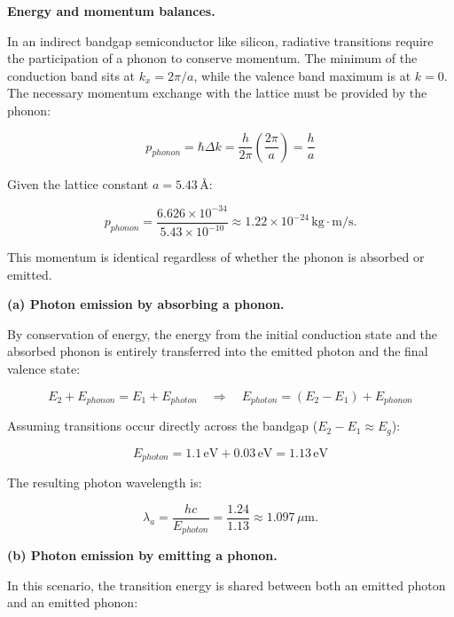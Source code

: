 \textbf{Energy and momentum balances.}

In an indirect bandgap semiconductor like silicon, radiative transitions require the participation of a phonon to conserve momentum. The minimum of the conduction band sits at $k_x = 2\pi/a$, while the valence band maximum is at $k = 0$. The necessary momentum exchange with the lattice must be provided by the phonon:

\begin{equation*}
  p_{phonon} = \hbar \Delta k = \frac{h}{2\pi} \left( \frac{2\pi}{a} \right) = \frac{h}{a}
\end{equation*}

Given the lattice constant $a = 5.43$\,\AA:

\begin{equation*}
  \boxed{p_{phonon} = \frac{6.626\times10^{-34}}{5.43\times10^{-10}} \approx 1.22\times10^{-24}\,\text{kg}\cdot\text{m/s}.}
\end{equation*}

This momentum is identical regardless of whether the phonon is absorbed or emitted.

\textbf{(a) Photon emission by absorbing a phonon.}

By conservation of energy, the energy from the initial conduction state and the absorbed phonon is entirely transferred into the emitted photon and the final valence state:

\begin{equation*}
  E_2 + E_{phonon} = E_1 + E_{photon} \quad\Longrightarrow\quad E_{photon} = (E_2 - E_1) + E_{phonon}
\end{equation*}

Assuming transitions occur directly across the bandgap ($E_2 - E_1 \approx E_g$):

\begin{equation*}
  E_{photon} = 1.1\,\text{eV} + 0.03\,\text{eV} = 1.13\,\text{eV}
\end{equation*}

The resulting photon wavelength is:

\begin{equation*}
  \boxed{\lambda_a = \frac{hc}{E_{photon}} = \frac{1.24}{1.13} \approx 1.097\,\mu\text{m}.}
\end{equation*}

\textbf{(b) Photon emission by emitting a phonon.}

In this scenario, the transition energy is shared between both an emitted photon and an emitted phonon:

